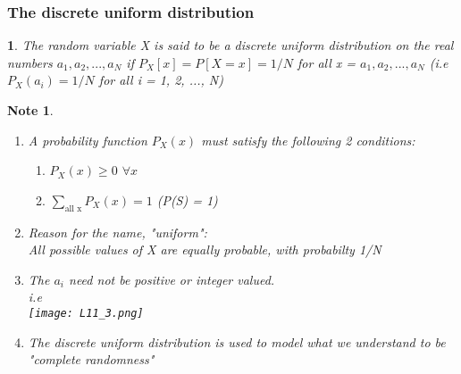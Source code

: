 \documentclass[11pt]{article}
\newtheorem*{note}{Note}
\newtheorem{definition}{\framebox{DEF}}[section]
\newcommand\tab[1][1cm]{\hspace*{#1}}
\begin{document}
            \subsubsection{The discrete uniform distribution}
                \begin{definition}
                    The random variable X is said to be a discrete uniform distribution on the real numbers $a_1, a_2, ... ,a_N$ 
                    if $P_X[x] = P[X = x] = 1/N$ for all x = $a_1, a_2, ... ,a_N$  
                    (i.e $P_X(a_i) = 1/N$ for all i = 1, 2, ..., N)
                \end{definition}
                \begin{note} \tab
                    \begin{enumerate}
                        \item A probability function $P_X(x)$ must satisfy the following 2 conditions:
                                \begin{enumerate}
                                    \item $P_X(x) \geq 0 $ \tab \tab $\forall x$
                                    \item $\sum\limits_{\text{all x}} P_X(x) = 1$ \tab (P(S) = 1)
                                \end{enumerate}
                        \item Reason for the name, "uniform": \\
                                All possible values of X are equally probable, with probabilty 1/N
                        \item The $a_i$ need not be positive or integer valued.\\ i.e \\\texttt{[image: L11\_3.png]}
                        \item The discrete uniform distribution is used to model what we understand to be "complete randomness"
                    \end{enumerate}
                \end{note}
\end{document}
